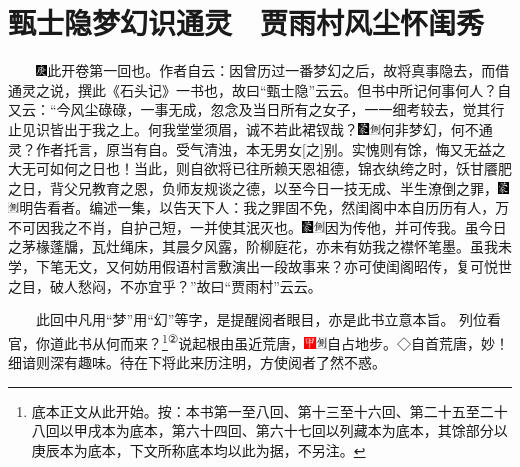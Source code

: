 
\chapter{甄士隐梦幻识通灵　贾雨村风尘怀闺秀}\label{calibre_pb_0}

　　{\includegraphics[width=3mm]{../Images/00004}此开卷第一回也。作者自云：因曾历过一番梦幻之后，故将真事隐去，而借通灵之说，撰此《石头记》一书也，故曰``甄士隐''云云。但书中所记何事何人？自又云：``今风尘碌碌，一事无成，忽念及当日所有之女子，一一细考较去，觉其行止见识皆出于我之上。何我堂堂须眉，诚不若此裙钗哉？{\includegraphics[width=3mm]{../Images/00006}\includegraphics[width=3mm]{../Images/00011}\footnotesize  何非梦幻，何不通灵？作者托言，原当有自。受气清浊，本无男女{[}之{]}别。}实愧则有馀，悔又无益之大无可如何之日也！当此，则自欲将已往所赖天恩祖德，锦衣纨绔之时，饫甘餍肥之日，背父兄教育之恩，负师友规谈之德，以至今日一技无成、半生潦倒之罪，{\includegraphics[width=3mm]{../Images/00006}\includegraphics[width=3mm]{../Images/00011}\footnotesize 明告看者。}编述一集，以告天下人：我之罪固不免，然闺阁中本自历历有人，万不可因我之不肖，自护己短，一并使其泯灭也。{\includegraphics[width=3mm]{../Images/00006}\includegraphics[width=3mm]{../Images/00011}\footnotesize 因为传他，并可传我。}虽今日之茅椽蓬牖，瓦灶绳床，其晨夕风露，阶柳庭花，亦未有妨我之襟怀笔墨。虽我未学，下笔无文，又何妨用假语村言敷演出一段故事来？亦可使闺阁昭传，复可悦世之目，破人愁闷，不亦宜乎？''故曰``贾雨村''云云。}

　　{此回中凡用``梦''用``幻''等字，是提醒阅者眼目，亦是此书立意本旨。}
列位看官，你道此书从何而来？\footnote{底本正文从此开始。按：本书第一至八回、第十三至十六回、第二十五至二十八回以甲戌本为底本，第六十四回、第六十七回以列藏本为底本，其馀部分以庚辰本为底本，下文所称底本均以此为据，不另注。}{\textsuperscript{②}\label{lnkback_2_a}}说起根由虽近荒唐，{\includegraphics[width=3mm]{../Images/00002}\includegraphics[width=3mm]{../Images/00011}\footnotesize 自占地步。◇自首荒唐，妙！}细谙则深有趣味。待在下将此来历注明，方使阅者了然不惑。

